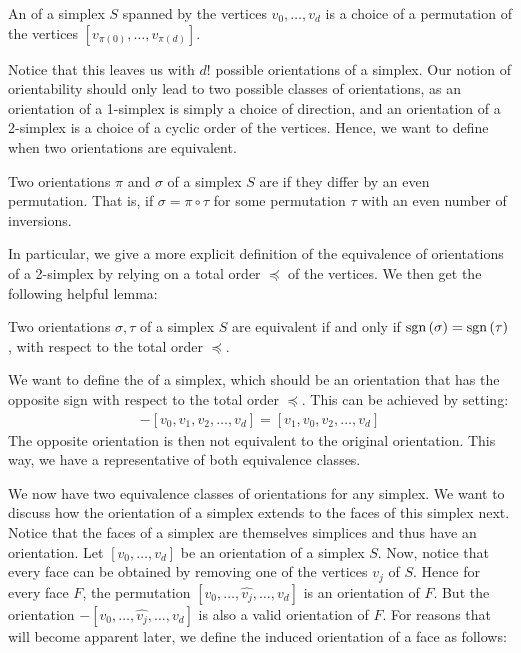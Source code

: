 \begin{definition}
	An  of a simplex $S$ spanned by the vertices $v_0, \dots, v_d$ is a choice of a permutation of the vertices $[v_{\pi(0)}, \dots, v_{\pi(d)}]$.
\end{definition}

Notice that this leaves us with $d!$ possible orientations of a simplex. Our notion of orientability should only lead to two possible classes of orientations, as an orientation of a 1-simplex is simply a choice of direction, and an orientation of a 2-simplex is a choice of a cyclic order of the vertices. Hence, we want to define when two orientations are equivalent.

\begin{definition}
	Two orientations $\pi$ and $\sigma$ of a simplex $S$ are  if they differ by an even permutation. That is, if $\sigma = \pi \circ \tau$ for some permutation $\tau$ with an even number of inversions.
\end{definition}

In particular, we give a more explicit definition of the equivalence of orientations of a 2-simplex by relying on a total order $\preceq$ of the vertices. We then get the following helpful lemma:

\begin{lemma}
	Two orientations $\sigma, \tau$ of a simplex $S$ are equivalent if and only if $\operatorname{sgn}\left(\sigma\right) = \operatorname{sgn}\left(\tau\right)$, with respect to the total order $\preceq$.
\end{lemma}

We want to define the  of a simplex, which should be an orientation that has the opposite sign with respect to the total order $\preceq$. This can be achieved by setting:
\begin{align*}
	- [v_0, v_1, v_2, \dots, v_d] = [v_1, v_0, v_2, \dots, v_d]
\end{align*}
The opposite orientation is then not equivalent to the original orientation. This way, we have a representative of both equivalence classes.

We now have two equivalence classes of orientations for any simplex. We want to discuss how the orientation of a simplex extends to the faces of this simplex next. Notice that the faces of a simplex are themselves simplices and thus have an orientation. Let $[v_0, \dots, v_{d}]$ be an orientation of a simplex $S$. Now, notice that every face can be obtained by removing one of the vertices $v_j$ of $S$. Hence for every face $F$, the permutation $[v_0, \dots, \hat{v_j}, \dots, v_{d}]$ is an orientation of $F$. But the orientation $- [v_0, \dots, \hat{v_j}, \dots, v_{d}]$ is also a valid orientation of $F$. For reasons that will become apparent later, we define the induced orientation of a face as follows:

